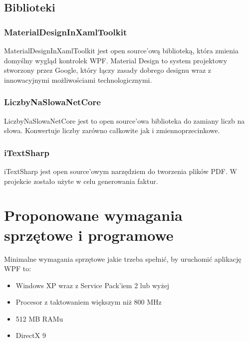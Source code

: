 \subsection{Biblioteki}

\subsubsection{MaterialDesignInXamlToolkit}
MaterialDesignInXamlToolkit \cite{MaterialDesignXAML} jest open source'ową biblioteką, która zmienia domyślny wygląd kontrolek WPF. Material Design to system projektowy stworzony przez Google, który łączy zasady dobrego designu wraz z innowacyjnymi możliwościami technologicznymi.

\subsubsection{LiczbyNaSlowaNetCore}
LiczbyNaSlowaNetCore \cite{LiczbyNaSlowa} jest to open source'owa biblioteka do zamiany liczb na słowa. Konwertuje liczby zarówno całkowite jak i zmiennoprzecinkowe.

\subsubsection{iTextSharp}
iTextSharp \cite{itext} jest open source'owym narzędziem do tworzenia plików PDF. W projekcie zostało użyte w celu generowania faktur.

\section{Proponowane wymagania sprzętowe i programowe}
Minimalne wymagania sprzętowe jakie trzeba spełnić, by uruchomić aplikację WPF to:
\begin{itemize}
    \item Windows XP wraz z Service Pack'iem 2 lub wyżej
    \item Procesor z taktowaniem większym niż 800 MHz
    \item 512 MB RAMu
    \item DirectX 9
\end{itemize}